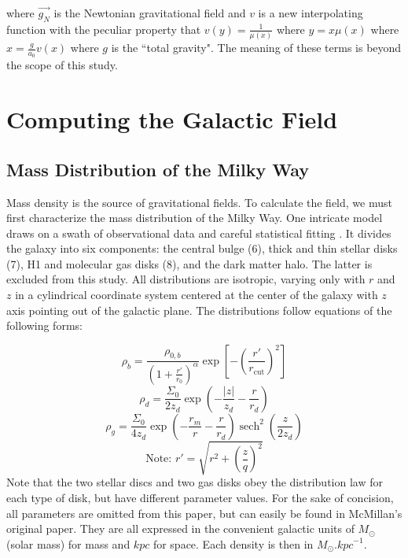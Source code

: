 \documentclass[11pt, twocolumn]{article}
\newcommand{\ff}[2]{\frac{#1}{#2}}
\newcommand{\abs}[1]{| #1 |}
\DeclareMathOperator{\sech}{sech}
\begin{document}
    where $\vec{g_N}$ is the Newtonian gravitational field and $v$ is a new interpolating function with the peculiar property that $v(y) = \frac{1}{\mu (x)}$ where $y = x\mu (x)$ where $x = \frac{g}{a_0}$$v(x)$ where $g$ is the ``total gravity". The meaning of these terms is beyond the scope of this study.

    \section*{Computing the Galactic Field}
        
    \subsection*{Mass Distribution of the Milky Way}
    Mass density is the source of gravitational fields. To calculate the field, we must first characterize the mass distribution of the Milky Way. One intricate model draws on a swath of observational data and careful statistical fitting \parencite{mcmillan_mass_2017}. It divides the galaxy into six components: the central bulge (6), thick and thin stellar disks (7), H1 and molecular gas disks (8), and the dark matter halo. The latter is excluded from this study. All distributions are isotropic, varying only with $r$ and $z$ in a cylindrical coordinate system centered at the center of the galaxy with $z$ axis pointing out of the galactic plane. The distributions follow equations of the following forms:

    \begin{equation}
    \label{}
    \rho_b = \ff{\rho_{0,b}}{\left(1 + \ff{r'}{r_0}\right)^\alpha} \exp{\left[ -\left(\ff{r'}{r_{\mbox{cut}}}\right)^2\right]}
    \end{equation}
    \begin{equation}
    \label{}
    \rho_d = \ff{\Sigma_0}{2z_d} \exp{\left(-\ff{\abs{z}}{z_d} - \ff{r}{r_d}\right)} 
    \end{equation}
    \begin{equation}
    \label{}
    \rho_g = \ff{\Sigma_0}{4z_d} \exp{\left(-\ff{r_m}{r} - \ff{r}{r_d}\right)} \sech^2{\left(\ff{z}{2z_d}\right)}
    \end{equation}
    \begin{equation}
    \label{}
    \text{Note: } r' = \sqrt{r^2 + \left(\ff{z}{q}\right)^2}
    \end{equation}
    Note that the two stellar discs and two gas disks obey the distribution law for each type of disk, but have different parameter values. For the sake of concision, all parameters are omitted from this paper, but can easily be found in McMillan's original paper. They are all expressed in the convenient galactic units of $\si{M_\odot}$ (solar mass) for mass and $\si{kpc}$ for space. Each density is then in $\si{M_\odot.{kpc}^{-1}}$.
\end{document}
